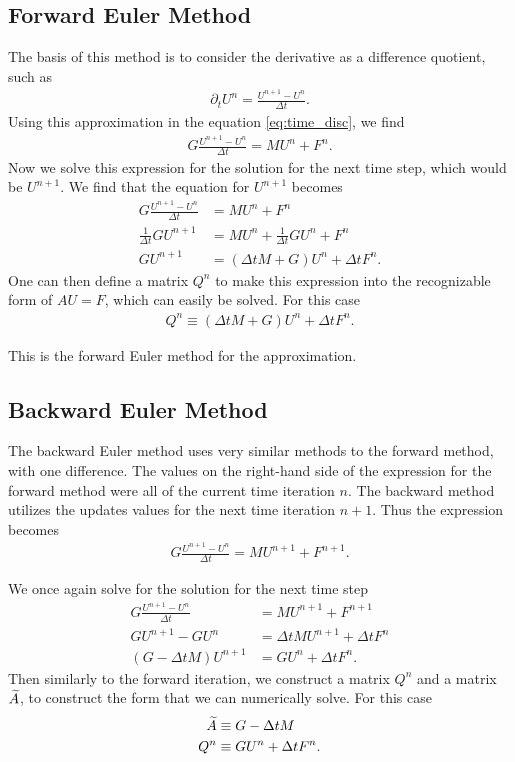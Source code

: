 \documentclass[../fem.tex]{subfile}
\begin{document}
\subsection{Forward Euler Method}%
\label{sub:forward_euler_method}

The basis of this method is to consider the derivative as a difference
quotient, such as
\begin{align*}
  \partial_t U^n=\frac{U^{n+1}-U^n}{\Delta t}.
\end{align*}
Using this approximation in the equation \ref{eq:time_disc}, we find
\begin{align*}
  G\frac{U^{n+1}-U^n}{\Delta t}=MU^n+F^n.
\end{align*}
Now we solve this expression for the solution for the next time step, which
would be $U^{n+1}$. We find that the equation for $U^{n+1}$ becomes
\begin{align*}
  G\frac{U^{n+1}-U^n}{\Delta t}&=MU^n+F^n\\
  \frac{1}{\Delta t}GU^{n+1}&=MU^n+\frac{1}{\Delta t}GU^n+F^n\\
  GU^{n+1}&=\left(\Delta tM+G\right)U^n+\Delta tF^n.
\end{align*}
One can then define a matrix $Q^n$ to make this expression into the
recognizable form of $AU=F$, which can easily be solved. For this case
\begin{align*}
  Q^n\equiv\left(\Delta tM+G\right)U^n+\Delta tF^n.
\end{align*}

This is the forward Euler method for the approximation.

\subsection{Backward Euler Method}%
\label{sub:backward_euler_method}

The backward Euler method uses very similar methods to the forward method, with
one difference. The values on the right-hand side of the expression for the
forward method were all of the current time iteration $n$. The backward method
utilizes the updates values for the next time iteration $n+1$. Thus the
expression becomes
\begin{align*}
  G\frac{U^{n+1}-U^n}{\Delta t}=MU^{n+1}+F^{n+1}.
\end{align*}

We once again solve for the solution for the next time step
\begin{align*}
  G\frac{U^{n+1}-U^n}{\Delta t}&=MU^{n+1}+F^{n+1}\\
  GU^{n+1}-GU^n&=\Delta tMU^{n+1}+\Delta tF^n\\
  \left(G-\Delta tM\right)U^{n+1}&=GU^n+\Delta tF^n.
\end{align*}
Then similarly to the forward iteration, we construct a matrix $Q^n$ and a
matrix $\widetilde{A}$, to construct the form that we can numerically solve. For this
case
\begin{align*}
  \widetilde{A}&\equiv G-\Delta tM\\
  Q^n&\equiv GU^n+\Delta tF^n.
\end{align*}
\end{document}
